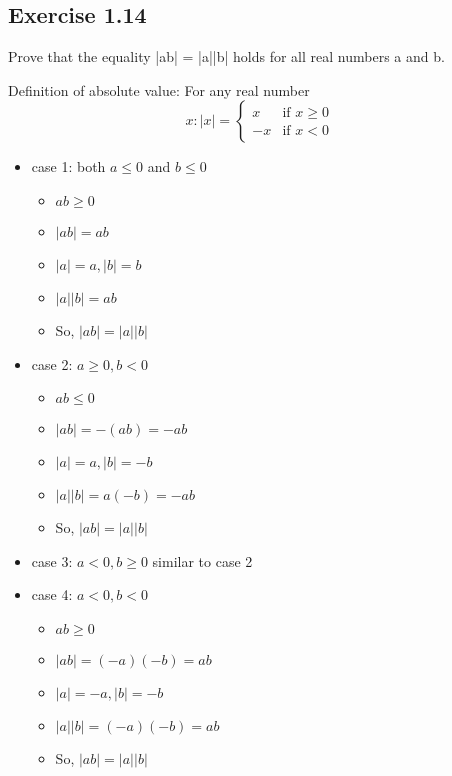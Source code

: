 \documentclass[12pt]{article}
\begin{document}
		\subsection*{Exercise 1.14}
			Prove that the equality |ab| = |a||b| holds for all real numbers a and b.
			
				Definition of absolute value:
				For any real number  \begin{equation*}
					x: |x| = \begin{cases}
						x &\text{if $x \ge 0$}\\
						-x &\text{if $x < 0$}
					\end{cases}
				\end{equation*}
				\begin{itemize}
					\item case 1: both $a \le 0$ and $b \le 0$
					\begin{itemize}
						\item $ab \ge 0$
						\item $|ab| = ab$
						\item $|a| = a, |b| = b$
						\item $|a||b| = ab$
						\item So, $|ab| = |a||b|$
					\end{itemize}
					\item case 2: $a \ge 0, b < 0$
					\begin{itemize}
						\item $ab \le 0$
						\item $|ab| = -(ab) = -ab$
						\item $|a|=a, |b| = -b$
						\item $|a||b| = a(-b) = -ab$
						\item So, $|ab| = |a||b|$
					\end{itemize}
					\item case 3: $a < 0, b \ge 0$
						similar to case 2
					\item case 4: $a < 0, b < 0$
					\begin{itemize}
						\item $ab \ge 0$
						\item $|ab| = (-a)(-b) = ab$
						\item $|a| = -a, |b| = -b$
						\item $|a||b| = (-a)(-b) = ab$
						\item So, $|ab| = |a||b|$
					\end{itemize}
				\end{itemize}
\end{document}
